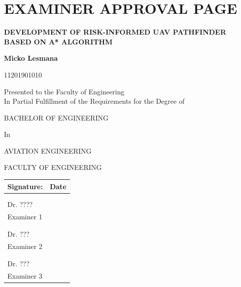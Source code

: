 \documentclass[12pt]{report}
\begin{document}
    \chapter*{EXAMINER APPROVAL PAGE}
        \begin{center}
        {\textbf{DEVELOPMENT OF RISK-INFORMED UAV PATHFINDER BASED ON A* ALGORITHM}}\par\vspace{0.1cm}
        \textbf{Micko Lesmana}\par
        {11201901010}\par
        Presented to the Faculty of Engineering\\
        In Partial Fulfillment of the Requirements for the Degree of\par\vspace{0.5cm}
        
        {BACHELOR OF ENGINEERING}\par
        {In}\par
        {AVIATION ENGINEERING}\par
        
        {FACULTY OF ENGINEERING}\par\vspace{1cm}

            \begin{tabular}{@{}p{4in}@{}|@{}p{1in}@{}}
            Signature:                          & Date\\
            \hline
                                                & \\
                                                & \\
            Dr. ????     & \\
            Examiner 1                          & \\
            \hline
                                                & \\
                                                & \\
            Dr. ???     & \\
            Examiner 2                          & \\
            \hline
                                                & \\
                                                & \\
            Dr. ???     & \\
            Examiner 3                          & \\
            \hline
            \end{tabular}
        \end{center}
\end{document}
